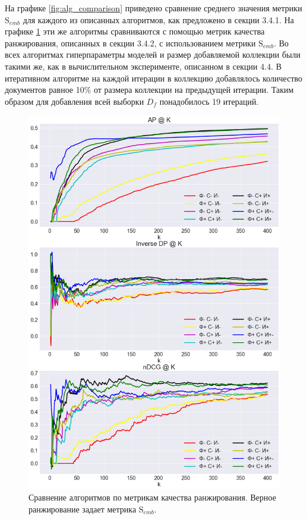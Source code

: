 На графике \ref{fig:alg_comparison} приведено сравнение среднего значения метрики $\mathrm{S}_{emb}$ для каждого из описанных алгоритмов, как предложено в секции 3.4.1. На графике \ref{fig:rank_comparison} эти же алгоритмы сравниваются с помощью метрик качества ранжирования, описанных в секции 3.4.2, с использованием метрики $\mathrm{S}_{emb}$. Во всех алгоритмах гиперпараметры моделей и размер добавляемой коллекции были такими же, как в вычислительном эксперименте, описанном в секции 4.4. В итеративном алгоритме на каждой итерации в коллекцию добавлялось количество документов равное 10\% от размера коллекции на предыдущей итерации. Таким образом для добавления всей выборки $D_f$ понадобилось 19 итераций.

\begin{figure}
    \centering 
    \includegraphics[width=1\textwidth]{img/ranking_alg_comparison.png}
    \caption{\label{fig:rank_comparison} Сравнение алгоритмов по метрикам качества ранжирования. Верное ранжирование задает метрика $\mathrm{S}_{emb}$.}
\end{figure}
